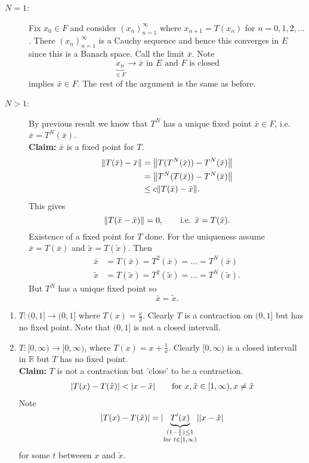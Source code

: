 \begin{beweis}
	\begin{description}
		\item[$N=1$:] Fix $x_0 \in F$ and consider $(x_n)_{n=1}^{\infty}$ where $x_{n+1} = T(x_n)$ for $n=0,1,2, \dots$. There $(x_n)_{n=1}^{\infty}$ is a Cauchy sequence and hence this converges in $E$ since this is a Banach space. Call the limit $\bar{x}$. Note
		\[
			\underset{\in F}{\underbrace{x_n}} \to \bar{x} \text{ in }E \text{ and $F$ is closed}
		\] 
		implies $\bar{x} \in F$. The rest of the argument is the same as before.
		\item[$N>1$:] By previous result we know that $T^N$ has a unique fixed point $\bar{x} \in F$, i.e. $\bar{x} = T^N(\bar{x})$. \\
		\textbf{Claim:} \text{    }     $\bar{x}$ is a fixed point for $T$.
		\begin{align*}
			\norm{T(\bar{x})-\bar{x}} &= \norm{T(T^N(\bar{x}))- T^N(\bar{x})} \\
			&= \norm{T^N(T(\bar{x}))- T^N(\bar{x})} \\
			&\leq c \norm{T(\bar{x})-\bar{x}}.
 		\end{align*}
		This gives 
		\[
			\norm{T(\bar{x}-\bar{x})} = 0, \qquad \text{i.e. }\bar{x} = T(\bar{x}).
		\]
		Existence of a fixed point for $T$ done. For the uniqueness assume $\bar{x} = T(\bar{x})$ and $\tilde x = T( \tilde x)$. Then
	\begin{align*}
		\bar{x} &= T( \bar{x}) = T^2(\bar{x}) = \dots = T^N(\bar{x}) \\
		\tilde x &= T(\tilde x) = T^2(\tilde x) = \dots = T^N(\tilde x).
	\end{align*}
	But $T^N$ has a unique fixed point so 
	\[
		\bar{x} = \tilde x.
	\]
	\end{description}
\end{beweis}
\begin{bemerkung}
	\begin{enumerate}[(1)]
		\item $T: (0,1] \to (0,1]$ where $T(x) = \frac{x}{2}$. Clearly $T$ is a contraction on $(0,1]$ but has no fixed point. Note that $(0,1]$ is not a closed intervall. 
		\item $T: [0,\infty) \to [0,\infty)$, where $T(x) = x + \frac{1}{x}$. Clearly $[0,\infty)$ is a closed intervall in $\mathbb{R}$ but $T$ has no fixed point. \\
		\textbf{Claim:} \text{    }     $T$ is not a contraction but 'close' to be a contraction. \\
		\begin{align*}
			\lvert T(x)-T(\tilde x)\rvert < \lvert x- \tilde x\rvert \qquad \text{for }x, \tilde x \in [1, \infty), x \neq \tilde x
		\end{align*}
		Note \[
			\lvert T(x)- T( \tilde x)\rvert = \lvert\underset{\substack{(1- \frac{1}{t})\leq 1 \\ \text{for }t \in [1,\infty)}}{\underbrace{T'(x)}}\rvert\lvert x- \tilde x\rvert
		\] for some $t$ betweeen $x$ and $\tilde x$.
	\end{enumerate}
\end{bemerkung}
